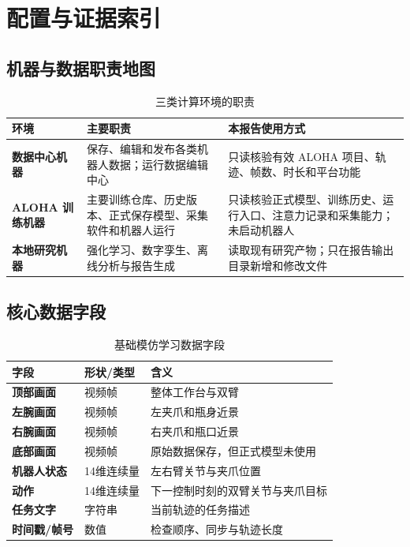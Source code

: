 \appendix
\chapter{配置与证据索引}

\section{机器与数据职责地图}

\begin{table}[H]
\centering
\caption{三类计算环境的职责}
\begin{tabularx}{\textwidth}{>{\bfseries}p{34mm}p{42mm}X}
\toprule
环境 & 主要职责 & 本报告使用方式\\
\midrule
数据中心机器 & 保存、编辑和发布各类机器人数据；运行数据编辑中心 & 只读核验有效 ALOHA 项目、轨迹、帧数、时长和平台功能\\
ALOHA 训练机器 & 主要训练仓库、历史版本、正式保存模型、采集软件和机器人运行 & 只读核验正式模型、训练历史、运行入口、注意力记录和采集能力；未启动机器人\\
本地研究机器 & 强化学习、数字孪生、离线分析与报告生成 & 读取现有研究产物；只在报告输出目录新增和修改文件\\
\bottomrule
\end{tabularx}
\end{table}

\section{核心数据字段}

\begin{table}[H]
\centering
\caption{基础模仿学习数据字段}
\begin{tabularx}{\textwidth}{>{\bfseries}p{35mm}p{32mm}X}
\toprule
字段 & 形状/类型 & 含义\\
\midrule
顶部画面 & 视频帧 & 整体工作台与双臂\\
左腕画面 & 视频帧 & 左夹爪和瓶身近景\\
右腕画面 & 视频帧 & 右夹爪和瓶口近景\\
底部画面 & 视频帧 & 原始数据保存，但正式模型未使用\\
机器人状态 & 14维连续量 & 左右臂关节与夹爪位置\\
动作 & 14维连续量 & 下一控制时刻的双臂关节与夹爪目标\\
任务文字 & 字符串 & 当前轨迹的任务描述\\
时间戳/帧号 & 数值 & 检查顺序、同步与轨迹长度\\
\bottomrule
\end{tabularx}
\end{table}

